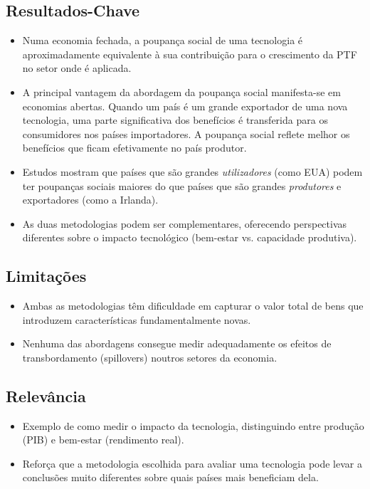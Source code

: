 \documentclass[12pt]{article}
\begin{document}
\subsection*{Resultados-Chave}
\begin{itemize}
    \item  Numa economia fechada, a poupança social de uma tecnologia é aproximadamente equivalente à sua contribuição para o crescimento da PTF no setor onde é aplicada.
    \item  A principal vantagem da abordagem da poupança social manifesta-se em economias abertas. Quando um país é um grande exportador de uma nova tecnologia, uma parte significativa dos benefícios é transferida para os consumidores nos países importadores. A poupança social reflete melhor os benefícios que ficam efetivamente no país produtor.
    \item  Estudos mostram que países que são grandes \textit{utilizadores} (como EUA) podem ter poupanças sociais maiores do que países que são grandes \textit{produtores} e exportadores (como a Irlanda).
    \item  As duas metodologias podem ser complementares, oferecendo perspectivas diferentes sobre o impacto tecnológico (bem-estar vs. capacidade produtiva).
\end{itemize}

\subsection*{Limitações}
\begin{itemize}
    \item  Ambas as metodologias têm dificuldade em capturar o valor total de bens que introduzem características fundamentalmente novas.
    \item  Nenhuma das abordagens consegue medir adequadamente os efeitos de transbordamento (spillovers) noutros setores da economia.
\end{itemize}

\subsection*{Relevância}
\begin{itemize}
    \item Exemplo de como medir o impacto da tecnologia, distinguindo entre produção (PIB) e bem-estar (rendimento real).
    \item Reforça que a metodologia escolhida para avaliar uma tecnologia pode levar a conclusões muito diferentes sobre quais países mais beneficiam dela.
\end{itemize}
\newpage
\end{document}

